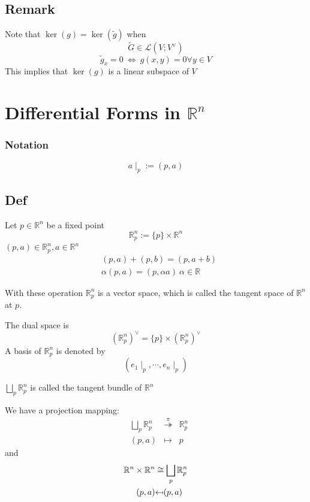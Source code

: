 \documentclass{book}
\begin{document}
\section{Remark}
Note that $\ker(g)=\ker(\tilde{g})$ when $$\tilde{G}\in \mathscr{L}(V;V^\vee)$$
$$\tilde{g}_x=0\ \Leftrightarrow\ g(x,y)=0\forall y\in V$$
This implies that $\ker(g)$ is a linear subspace of $V$
\chapter{Differential Forms in $\mathbb{R}^n$}
\subsection{Notation}
$$a\mid_p:=(p,a)$$
\section{Def}

Let $p\in \mathbb{R}^n$ be a fixed point
$$\mathbb{R}^n_p:=\{p\}\times\mathbb{R}^n$$
$(p,a)\in \mathbb{R}^n_p,a\in \mathbb{R}^n$
$$\begin{aligned}
    &(p,a)+(p,b)=(p,a+b)\\ &\alpha(p,a)=(p,\alpha a)\  \alpha\in \mathbb{R}
\end{aligned}$$

With these operation $\mathbb{R}^n_p$ is a vector space, which is called the tangent space of $\mathbb{R}^n$ at $p$.

The dual space is $$(\mathbb{R}^n_p)^\vee=\{p\}\times(\mathbb{R}_p^n)^\vee$$
A basis of $\mathbb{R}_p^n$ is denoted by $$(e_1\mid_p,\cdots,e_n\mid_p)$$

$\bigsqcup\limits_p \mathbb{R}^n_p$ is called the tangent bundle of $\mathbb{R}^n$

We have a projection mapping:
$$ 
\begin{aligned}
    &\bigsqcup \limits_{p}\mathbb{R}^n_p&\stackrel{\pi}{\twoheadrightarrow}&\mathbb{R}^n_p\\ &(p,a)&\mapsto &p
\end{aligned}$$
and 
$$
\begin{aligned}
    \mathbb{R}^n\times\mathbb{R}^n &\cong \bigsqcup \limits_{p}\mathbb{R}^n_p\\ (p,a) &\reflectbox{\ensuremath{\mapsto}} (p,a)
\end{aligned}
$$
\end{document}

